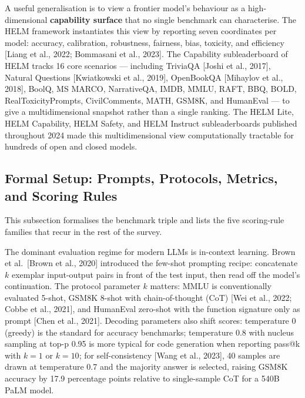 A useful generalisation is to view a frontier model's behaviour as a high-dimensional \textbf{capability surface} that no single benchmark can characterise. The HELM framework instantiates this view by reporting seven coordinates per model: accuracy, calibration, robustness, fairness, bias, toxicity, and efficiency {[}Liang et al., 2022; Bommasani et al., 2023{]}. The Capability subleaderboard of HELM tracks 16 core scenarios --- including TriviaQA {[}Joshi et al., 2017{]}, Natural Questions {[}Kwiatkowski et al., 2019{]}, OpenBookQA {[}Mihaylov et al., 2018{]}, BoolQ, MS MARCO, NarrativeQA, IMDB, MMLU, RAFT, BBQ, BOLD, RealToxicityPrompts, CivilComments, MATH, GSM8K, and HumanEval --- to give a multidimensional snapshot rather than a single ranking. The HELM Lite, HELM Capability, HELM Safety, and HELM Instruct subleaderboards published throughout 2024 made this multidimensional view computationally tractable for hundreds of open and closed models.

\subsection{Formal Setup: Prompts, Protocols, Metrics, and Scoring Rules}\label{formal-setup-prompts-protocols-metrics-and-scoring-rules}

This subsection formalises the benchmark triple and lists the five scoring-rule families that recur in the rest of the survey.

The dominant evaluation regime for modern LLMs is in-context learning. Brown et al.~{[}Brown et al., 2020{]} introduced the few-shot prompting recipe: concatenate \(k\) exemplar input-output pairs in front of the test input, then read off the model's continuation. The protocol parameter \(k\) matters: MMLU is conventionally evaluated 5-shot, GSM8K 8-shot with chain-of-thought (CoT) {[}Wei et al., 2022; Cobbe et al., 2021{]}, and HumanEval zero-shot with the function signature only as prompt {[}Chen et al., 2021{]}. Decoding parameters also shift scores: temperature 0 (greedy) is the standard for accuracy benchmarks; temperature 0.8 with nucleus sampling at top-p 0.95 is more typical for code generation when reporting pass@k with \(k=1\) or \(k=10\); for self-consistency {[}Wang et al., 2023{]}, 40 samples are drawn at temperature 0.7 and the majority answer is selected, raising GSM8K accuracy by 17.9 percentage points relative to single-sample CoT for a 540B PaLM model.

